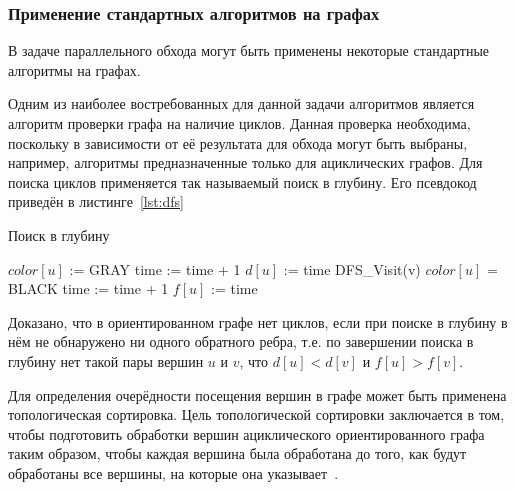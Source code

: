 \subsubsection{Применение стандартных алгоритмов на графах}
В задаче параллельного обхода могут быть применены некоторые стандартные алгоритмы на графах.

Одним из наиболее востребованных для данной задачи алгоритмов является алгоритм проверки графа на наличие циклов. Данная проверка необходима, поскольку в зависимости от её результата для обхода могут быть выбраны, например, алгоритмы предназначенные только для ациклических графов. Для поиска циклов применяется так называемый поиск в глубину. Его псевдокод приведён в листинге~\ref{lst:dfs}
\begin{algorithm}[H]
	\caption{Поиск в глубину}\label{lst:dfs}
	\begin{algorithmic}[1]
		\State $color[u]$ := GRAY
		\State time := time + 1
		\State $d[u]$ := time 
		\State DFS_Visit(v)
		\EndIf
		\EndFor
		\State $color[u]$ = BLACK
		\State time := time + 1
		\State $f[u]$ := time 
		\EndProcedure
	\end{algorithmic}
\end{algorithm}
Доказано\cite{Cormen2005}, что в ориентированном графе нет циклов, если при поиске в глубину в нём не обнаружено ни одного обратного ребра, т.е. по завершении поиска в глубину нет такой пары вершин $u$ и $v$, что $d[u]<d[v]$ и $f[u]>f[v]$.

Для определения очерёдности посещения вершин в графе может быть применена топологическая сортировка. Цель топологической сортировки заключается в том, чтобы подготовить обработки вершин ациклического ориентированного графа таким образом, чтобы каждая вершина была обработана до того, как будут обработаны все вершины, на которые она указывает~\cite{Sedge2002}.

\noteattributes{}
